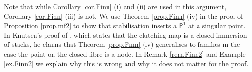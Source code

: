 \documentclass[a4paper,10pt]{amsart}
\theoremstyle{plain}
\theoremstyle{definition}
\theoremstyle{remark}
\numberwithin{equation}{xx}
\newcommand{\BB}[1]{\mathbb{{#1}}}
\begin{document}
Note that while Corollary \ref{cor.Finn} (i) and (ii) are used in this argument, Corollary \ref{cor.Finn} (iii) is not. We use Theorem \ref{prop.Finn} (iv) in the proof of Proposition \ref{prop.mf2} to show that stabilisation inserts a \(\BB{P}^{1}\) at a singular point.
In Knutsen's proof of \cite[3.7]{knu:83a}, which states that the clutching map is a closed immersion of stacks, he claims that Theorem \ref{prop.Finn} (iv) generalises to families in the case the point on the closed fibre is a node. In Remark \ref{rem.Finn2} and Example \ref{ex.Finn2} we explain why this is wrong and why it does not matter for the proof.
%
\providecommand{\bysame}{\leavevmode\hbox to3em{\hrulefill}\thinspace}
\providecommand{\MR}{\relax\ifhmode\unskip\space\fi MR }
\providecommand{\MRhref}[2]{%
  \href{http://www.ams.org/mathscinet-getitem?mr=#1}{#2}
}
\providecommand{\href}[2]{#2}
\end{document}
